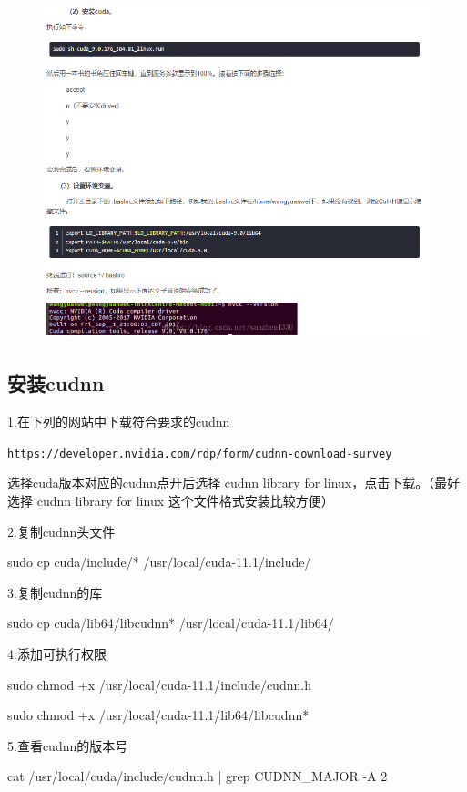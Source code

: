 \documentclass[openbib]{article}
\begin{document}
\begin{figure}[H]
	\centering
	\includegraphics[scale=0.4]{51}
\end{figure}

\subsection{安装cudnn}
1.在下列的网站中下载符合要求的cudnn

\texttt{https://developer.nvidia.com/rdp/form/cudnn-download-survey}

选择cuda版本对应的cudnn点开后选择 cudnn library for linux，点击下载。（最好选择 cudnn library for linux 这个文件格式安装比较方便）

2.复制cudnn头文件

sudo cp cuda/include/* /usr/local/cuda-11.1/include/

3.复制cudnn的库

sudo cp cuda/lib64/libcudnn* /usr/local/cuda-11.1/lib64/

4.添加可执行权限

sudo chmod +x /usr/local/cuda-11.1/include/cudnn.h

sudo chmod +x /usr/local/cuda-11.1/lib64/libcudnn*

5.查看cudnn的版本号

cat /usr/local/cuda/include/cudnn.h | grep CUDNN\_MAJOR -A 2
\end{document}
